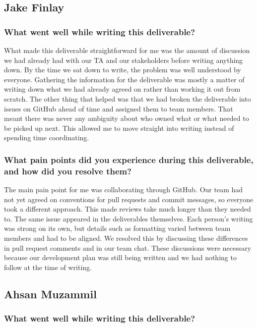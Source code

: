 \documentclass{article}
\begin{document}
\subsection*{Jake Finlay}

\subsubsection*{What went well while writing this deliverable?}

What made this deliverable straightforward for me was the amount of discussion
we had already had with our TA and our stakeholders before writing anything
down. By the time we sat down to write, the problem was well understood by
everyone. Gathering the information for the deliverable was mostly a matter
of writing down what we had already agreed on rather than working it out from
scratch. The other thing that helped was that we had broken the deliverable into
issues on GitHub ahead of time and assigned them to team members. That meant
there was never any ambiguity about who owned what or what needed to be picked
up next. This allowed me to move straight into writing instead of spending time
coordinating.

\subsubsection*{What pain points did you experience during this deliverable,
and how did you resolve them?}

The main pain point for me was collaborating through GitHub. Our team had not
yet agreed on conventions for pull requests and commit messages, so everyone
took a different approach. This made reviews take much longer than they needed
to. The same issue appeared in the deliverables themselves. Each person's
writing was strong on its own, but details such as formatting varied between
team members and had to be aligned. We resolved this by discussing these
differences in pull request comments and in our team chat. These discussions
were necessary because our development plan was still being written and we had
nothing to follow at the time of writing.

\subsection*{Ahsan Muzammil}

\subsubsection*{What went well while writing this deliverable?}
\end{document}
